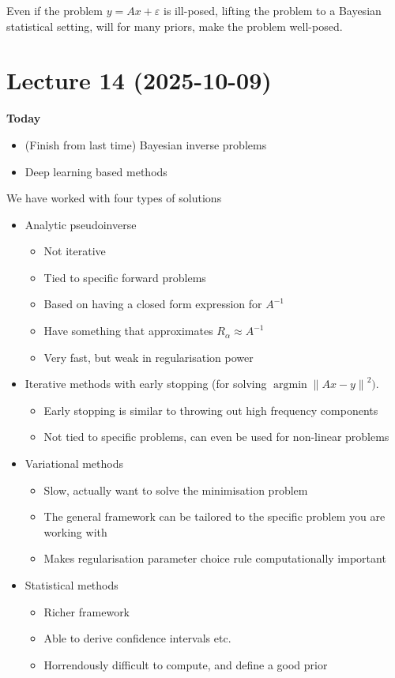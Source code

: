 \documentclass[12pt]{article}
\theoremstyle{definition}
\DeclareMathOperator{\argmin}{argmin}
\newcommand\norm[1]{\left\lVert#1\right\rVert}
\begin{document}
Even if the problem $y= Ax+\varepsilon$ is ill-posed, lifting the problem to a Bayesian statistical setting, will for many priors, make the problem well-posed.

\newpage

\section{Lecture 14 (2025-10-09)}
\textbf{Today}
\begin{itemize}
    \item (Finish from last time) Bayesian inverse problems
    \item Deep learning based methods
\end{itemize}

We have worked with four types of solutions
\begin{itemize}
    \item Analytic pseudoinverse
    \begin{itemize}
        \item Not iterative
        \item Tied to specific forward problems
        \item Based on having a closed form expression for $A^{-1}$
        \item Have something that approximates $R_\alpha \approx A^{-1}$
        \item Very fast, but weak in regularisation power 
    \end{itemize}
    \item Iterative methods with early stopping (for solving $\argmin \norm{Ax-y}^2)$.
    \begin{itemize}
        \item Early stopping is similar to throwing out high frequency components
        \item Not tied to specific problems, can even be used for non-linear problems
    \end{itemize}
    \item Variational methods
    \begin{itemize}
        \item Slow, actually want to solve the minimisation problem
        \item The general framework can be tailored to the specific problem you are working with
        \item Makes regularisation parameter choice rule computationally important
    \end{itemize}
    \item Statistical methods
    \begin{itemize}
        \item Richer framework
        \item Able to derive confidence intervals etc.
        \item Horrendously difficult to compute, and define a good prior
    \end{itemize}
\end{itemize}
\end{document}
